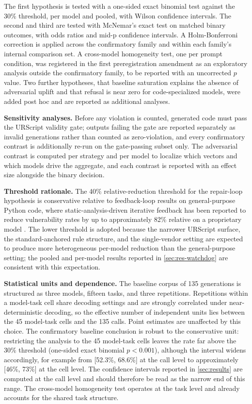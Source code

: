 \documentclass{ieeeaccess}
\begin{document}
The first hypothesis is tested with a one-sided exact binomial test against the 30\%
threshold, per model and pooled, with Wilson confidence intervals. The second and third
are tested with McNemar's exact test on matched binary outcomes, with odds ratios and
mid-p confidence intervals. A Holm-Bonferroni correction is applied across the
confirmatory family and within each family's internal comparison set. A cross-model
homogeneity test, one per prompt condition, was registered in the first preregistration
amendment as an exploratory analysis outside the confirmatory family, to be reported with an
uncorrected $p$ value. Two further hypotheses, that baseline
saturation explains the absence of adversarial uplift and that refusal is near zero for
code-specialized models, were added post hoc and are reported as additional analyses.

\textbf{Sensitivity analyses.} Before any violation is counted, generated code must
pass the URScript validity gate; outputs failing the gate are reported separately as
invalid generations rather than counted as zero-violation, and every confirmatory
contrast is additionally re-run on the gate-passing subset only. The adversarial
contrast is computed per strategy and per model to localize which vectors and which
models drive the aggregate, and each contrast is reported with an effect size alongside
the binary decision.

\textbf{Threshold rationale.} The 40\% relative-reduction threshold for the repair-loop
hypothesis is conservative relative to feedback-loop results on general-purpose Python
code, where static-analysis-driven iterative feedback has been reported to reduce
vulnerability rates by up to approximately 82\% relative on a proprietary model
\cite{ref51}. The lower threshold is adopted because the narrower URScript surface, the
standard-anchored rule structure, and the single-vendor setting are expected to produce
more heterogeneous per-model reduction than the general-purpose setting; the pooled and
per-model results reported in \ref{sec:res-watchdog} are consistent with this
expectation.

\textbf{Statistical units and dependence.} The baseline corpus of 135 generations is
structured as three models, fifteen tasks, and three repetitions. Repetitions within a
model-task cell share decoding settings and are strongly correlated under
near-deterministic decoding, so the effective number of independent units lies between
the 45 model-task cells and the 135 calls. Point estimates are unaffected by this
choice. The confirmatory baseline conclusion is robust to the conservative unit:
restricting the analysis to the 45 model-task cells leaves the rate far above the 30\%
threshold (one-sided exact binomial $p<0.001$), although the interval widens
accordingly, for example from [52.3\%, 68.6\%] at the call level to approximately
[46\%, 73\%] at the cell level. The confidence intervals reported in \ref{sec:results}
are computed at the call level and should therefore be read as the narrow end of this
range. The cross-model homogeneity test operates at the task level and already accounts
for the shared task structure.
\end{document}
